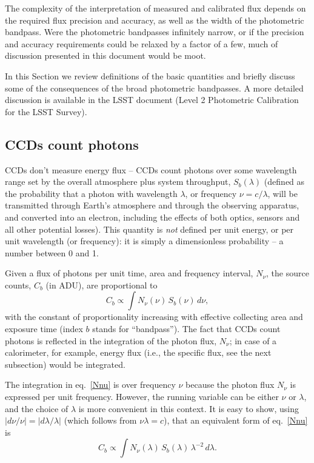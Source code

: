 \documentclass[DM,toc]{lsstdoc}
\begin{document}
The complexity of the interpretation of measured and calibrated flux depends on
the required flux precision and accuracy, as well as the width of the photometric bandpass.
Were the photometric bandpasses infinitely narrow, or if the precision and accuracy
requirements could be relaxed by a factor of a few, much of discussion presented in this
document would be moot.

In this Section we review definitions of the basic quantities and briefly discuss some of the
consequences of the broad photometric bandpasses. A more detailed discussion is
available in the LSST document  (Level 2 Photometric Calibration for the LSST Survey).


\subsection{CCDs count photons}

CCDs don't measure energy flux -- CCDs count photons over some wavelength range set
by the overall atmosphere plus system throughput,  $S_b(\lambda)$ (defined as the probability
that a photon with wavelength $\lambda$, or frequency $\nu=c/\lambda$,  will be
transmitted through Earth's atmosphere and through the observing apparatus, and converted
into an electron, including the effects of both optics, sensors and all other potential losses).
This quantity is \textit{not}  defined per unit energy, or per unit wavelength (or frequency):
it is simply a dimensionless probability -- a number between 0 and 1.

Given a flux of photons per unit time, area and frequency interval, $N_\nu$, the
source counts, $C_b$ (in ADU), are proportional to
\begin{equation}
\label{Nnu}
        C_b \propto \int N_\nu(\nu) \, S_b(\nu) \, d\nu,
\end{equation}
with the constant of proportionality increasing with effective collecting area and exposure
time (index $b$ stands for ``bandpass''). The fact that CCDs count photons is reflected in
the integration of the photon flux, $N_\nu$; in case of a calorimeter, for example, energy
flux (i.e., the specific flux, see the next subsection) would be integrated.

The integration in eq.~\ref{Nnu} is over frequency $\nu$ because the photon flux $N_\nu$
is expressed per unit frequency. However, the running variable can be either  $\nu$ or
$\lambda$, and the choice of $\lambda$ is more convenient in this context. It is
easy to show, using $|d\nu/\nu| = |d\lambda / \lambda|$ (which follows from $\nu \lambda=c$),
that an equivalent form of  eq.~\ref{Nnu} is
\begin{equation}
\label{Nnu2}
         C_b\propto \int N_\nu(\lambda) \, S_b(\lambda) \, \lambda^{-2} \, d\lambda.
\end{equation}
\end{document}
